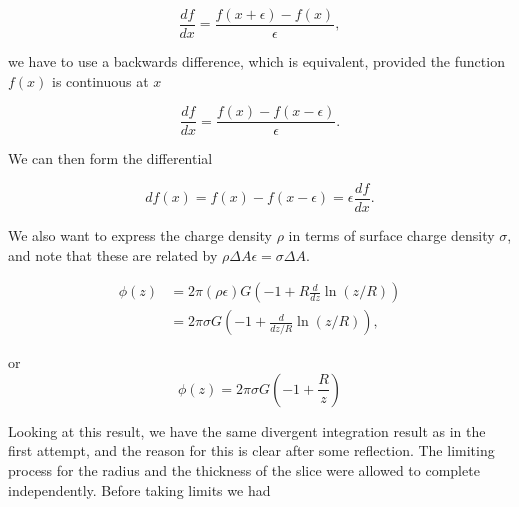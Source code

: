 \begin{equation}\label{eqn:infiniteSheetPotentials:310}
\frac{df}{dx} = \frac{f(x + \epsilon) - f(x)}{\epsilon},
\end{equation}

we have to use a backwards difference, which is equivalent, provided the function $f(x)$ is continuous at $x$

\begin{equation}\label{eqn:infiniteSheetPotentials:310b}
\frac{df}{dx} = \frac{f(x) - f(x -\epsilon)}{\epsilon}.
\end{equation}

We can then form the differential

\begin{equation}\label{eqn:qmTwoExamReflection:310c}
df(x) = f(x) - f(x -\epsilon) = \epsilon \frac{df}{dx}.
\end{equation}

We also want to express the charge density $\rho$ in terms of surface charge density $\sigma$, and note that these are related by $\rho \Delta A \epsilon = \sigma \Delta A$.

\begin{align*}
\phi(z) 
&=
2 \pi (\rho \epsilon) G 
\left( -1 + R \frac{d}{dz} \ln(z/R) \right) \\
&=
2 \pi \sigma G 
\left( -1 + \frac{d}{dz/R} \ln(z/R) \right),
\end{align*}

or
\begin{equation}\label{eqn:infiniteSheetPotentials:350}
\phi(z)
=
2 \pi \sigma G 
\left( -1 + \frac{R}{z} \right)
\end{equation}

%
%

Looking at this result, we have the same divergent integration result as in the first attempt, and the reason for this is clear after some reflection.  The limiting process for the radius and the thickness of the slice were allowed to complete independently.  Before taking limits we had

